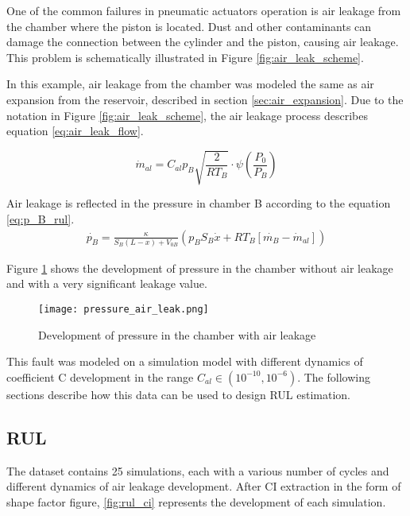 One of the common failures in pneumatic actuators operation is air leakage
from the chamber where the piston is located. Dust and other contaminants
can damage the connection between the cylinder and the piston, causing air
leakage. This problem is schematically illustrated in Figure
\ref{fig:air_leak_scheme}.


In this example, air leakage from the chamber was modeled the same as air
expansion from the reservoir, described in section \ref{sec:air_expansion}.  Due to the
notation in Figure \ref{fig:air_leak_scheme}, the air leakage process
describes equation \ref{eq:air_leak_flow}.

\begin{equation}
    \dot{m}_{al} = C_{al} p_B \sqrt{\frac{2}{R T_B}} \cdot
    \psi\left( \frac{P_0}{P_B} \right)
    \label{eq:air_leak_flow}
\end{equation}

Air leakage is reflected in the pressure in chamber B according to the
equation \ref{eq:p_B_rul}.
\begin{align}
    \dot{p_B} = \frac{\kappa}{S_B (L-x) + V_{0B}} \left(p_B S_B\dot{x} +
    RT_B[\dot{m_B}-\dot{m}_{al}] \right)
    \label{eq:p_B_rul}
\end{align}

Figure \ref{fig:pressure_air_leak} shows the development of pressure in the
chamber without air leakage and with a very significant leakage value.

\begin{figure}[h!]
    \centering
    \texttt{[image: pressure\_air\_leak.png]}
    \caption{Development of pressure in the chamber with air leakage}
    \label{fig:pressure_air_leak}
\end{figure}

This fault was modeled on a simulation model with different dynamics of
coefficient C development in the range $C_{al} \in (10^{-10}, 10^{-6})$.
The following sections describe how this data can be used to design RUL
estimation.


\subsection{RUL}

The dataset contains 25 simulations, each with a various number of cycles
and different dynamics of air leakage development. After CI extraction in
the form of shape factor figure, \ref{fig:rul_ci} represents the
development of each simulation.

